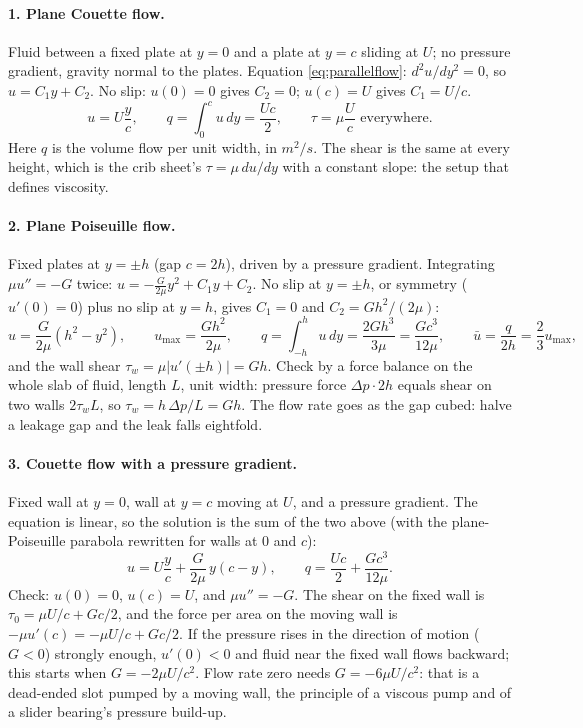 \paragraph{1. Plane Couette flow.} Fluid between a fixed plate at $y = 0$ and a plate at $y = c$ sliding at $U$; no pressure gradient, gravity normal to the plates. Equation \eqref{eq:parallelflow}: $d^2u/dy^2 = 0$, so $u = C_1 y + C_2$. No slip: $u(0) = 0$ gives $C_2 = 0$; $u(c) = U$ gives $C_1 = U/c$.
\[
u = U\frac{y}{c}, \qquad q = \int_0^c u\,dy = \frac{Uc}{2}, \qquad \tau = \mu\frac{U}{c} \text{ everywhere.}
\]
Here $q$ is the volume flow per unit width, in $\unit{m^2/s}$. The shear is the same at every height, which is the crib sheet's $\tau = \mu\,du/dy$ with a constant slope: the setup that defines viscosity.

\paragraph{2. Plane Poiseuille flow.} Fixed plates at $y = \pm h$ (gap $c = 2h$), driven by a pressure gradient. Integrating $\mu u'' = -G$ twice: $u = -\frac{G}{2\mu}y^2 + C_1y + C_2$. No slip at $y = \pm h$, or symmetry ($u'(0) = 0$) plus no slip at $y = h$, gives $C_1 = 0$ and $C_2 = Gh^2/(2\mu)$:
\[
u = \frac{G}{2\mu}(h^2 - y^2), \qquad u_{\max} = \frac{Gh^2}{2\mu}, \qquad
q = \int_{-h}^{h}u\,dy = \frac{2Gh^3}{3\mu} = \frac{Gc^3}{12\mu}, \qquad \bar u = \frac{q}{2h} = \frac{2}{3}u_{\max},
\]
and the wall shear $\tau_w = \mu|u'(\pm h)| = Gh$. Check by a force balance on the whole slab of fluid, length $L$, unit width: pressure force $\Delta p\cdot 2h$ equals shear on two walls $2\tau_w L$, so $\tau_w = h\,\Delta p/L = Gh$. The flow rate goes as the gap cubed: halve a leakage gap and the leak falls eightfold.

\paragraph{3. Couette flow with a pressure gradient.} Fixed wall at $y = 0$, wall at $y = c$ moving at $U$, and a pressure gradient. The equation is linear, so the solution is the sum of the two above (with the plane-Poiseuille parabola rewritten for walls at $0$ and $c$):
\[
u = U\frac{y}{c} + \frac{G}{2\mu}\,y(c - y), \qquad q = \frac{Uc}{2} + \frac{Gc^3}{12\mu}.
\]
Check: $u(0) = 0$, $u(c) = U$, and $\mu u'' = -G$. The shear on the fixed wall is $\tau_0 = \mu U/c + Gc/2$, and the force per area on the moving wall is $-\mu u'(c) = -\mu U/c + Gc/2$. If the pressure rises in the direction of motion ($G < 0$) strongly enough, $u'(0) < 0$ and fluid near the fixed wall flows backward; this starts when $G = -2\mu U/c^2$. Flow rate zero needs $G = -6\mu U/c^2$: that is a dead-ended slot pumped by a moving wall, the principle of a viscous pump and of a slider bearing's pressure build-up.

